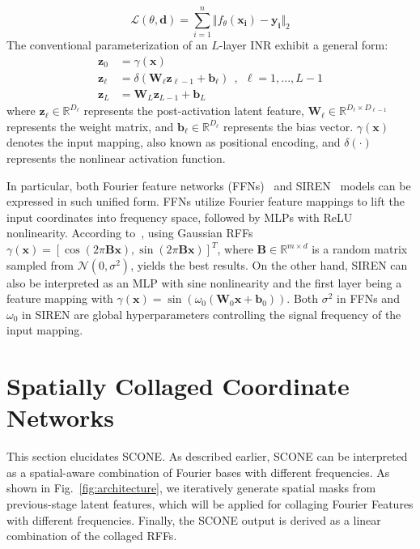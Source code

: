 \documentclass[letterpaper]{article} %
\newcommand{\Lagr}{\mathcal{L}}
\newcommand{\mat}[1]{\bm{#1}}
\begin{document}
\begin{equation}
\Lagr(\theta, \mathbf{d}) =  \sum^{n}_{i=1}\Vert f_\theta(\mathbf{x_i}) - \mathbf{y_i} \Vert_2
\end{equation}%
The conventional parameterization of an $L$-layer INR exhibit a general form:
\begin{equation}
    \begin{aligned}
         \mathbf{z}_{0} &= \gamma(\mathbf{x}) \\
         \mathbf{z}_{\ell} &= \delta(\mat{W}_{\ell} \mathbf{z}_{\ell-1} + \mathbf{b}_{\ell}) \ \ , \ \ \ell = 1, ... , L-1 \\
         \mathbf{z}_{L} &= \mat{W}_{L}\mathbf{z}_{L - 1} +\mathbf{b}_{L}
    \end{aligned}%
\end{equation}%
where $\mathbf{z}_{\ell}\in\mathbb{R}^{D_{\ell}}$ represents the post-activation latent feature, $\mat{W}_{\ell}\in\mathbb{R}^{D_{\ell}\times D_{\ell-1}}$ represents the weight matrix, and $\mathbf{b}_{\ell}\in \mathbb{R}^{D_{\ell}}$ represents the bias vector. $\gamma(\mathbf{x})$ denotes the input mapping, also known as positional encoding, and $\delta(\cdot)$ represents the nonlinear activation function. 

In particular, both Fourier feature networks (FFNs)~\cite{tancik2020fourier} and SIREN~\cite{2020siren} models can be expressed in such unified form. FFNs utilize Fourier feature mappings to lift the input coordinates into frequency space, followed by MLPs with ReLU nonlinearity. According to~\cite{tancik2020fourier}, using Gaussian RFFs $\gamma(\mathbf{x}) = [\cos(2\pi\mathbf{Bx}), \sin(2\pi\mathbf{Bx})]^T$, where $\mathbf{B} \in \mathbb{R}^{m \times d}$ is a random matrix sampled from $\mathcal{N}(0, \sigma^2)$, yields the best results. On the other hand, SIREN can also be interpreted as an MLP with sine nonlinearity and the first layer being a feature mapping with $\gamma(\mathbf{x}) = \sin{(\omega_0 (\mat{W}_{0} \mathbf{x} + \mathbf{b}_{0}))}$. Both $\sigma^2$ in FFNs and $\omega_0$ in SIREN are global hyperparameters controlling the signal frequency of the input mapping. 

\section{Spatially Collaged Coordinate Networks}
\label{subsec:method_scone}
This section elucidates SCONE. As described earlier, SCONE can be interpreted as a spatial-aware combination of Fourier bases with different frequencies. As shown in Fig.~\ref{fig:architecture}, we iteratively generate spatial masks from previous-stage latent features, which will be applied for collaging Fourier Features with different frequencies. Finally, the SCONE output is derived as a linear combination of the collaged RFFs. 
\end{document}
